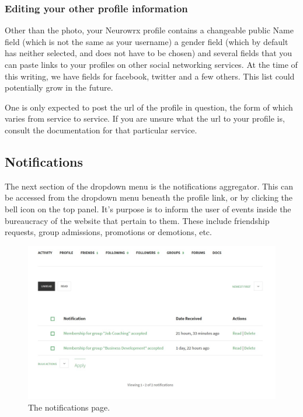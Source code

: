 \documentclass[10pt]{article}
\begin{document}
\subsubsection{Editing your other profile information}

\begin{flushleft}
Other than the photo, your Neurowrx profile contains a changeable public Name field (which is not the same as your username) a gender field (which by default has neither selected, and does not have to be chosen) and several fields that you can paste links to your profiles on other social networking services.  At the time of this writing, we have fields for facebook, twitter and a few others.  This list could potentially grow in the future.  
\end{flushleft}

\begin{flushleft}
One is only expected to post the url of the profile in question, the form of which varies from service to service.  If you are unsure what the url to your profile is, consult the documentation for that particular service. 
\end{flushleft}

\subsection{Notifications} \label{Notifications}
\begin{flushleft}
The next section of the dropdown menu is the notifications aggregator. This can be accessed from the dropdown menu beneath the profile link, or by clicking the bell icon on the top panel.  It's purpose is to inform the user of events inside the bureaucracy of the website that pertain to them.  These include friendship requests, group admissions, promotions or demotions, etc.   
\end{flushleft}

\begin{figure}[H]
    \centering
    \includegraphics[scale=0.5]{images/notifications.jpg}
    \caption{The notifications page.}
    \label{notifpage}
\end{figure}
\end{document}
